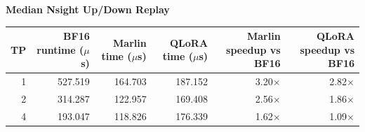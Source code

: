 \documentclass{article}
\begin{document}
\sffamily
\begin{center}
\textbf{Median Nsight Up/Down Replay}

\vspace{0.35em}
\renewcommand{\arraystretch}{1.25}
\begin{tabular}{r r r r r r}
\toprule
TP &
BF16 runtime ($\mu$s) &
Marlin time ($\mu$s) &
QLoRA time ($\mu$s) &
Marlin speedup vs BF16 &
QLoRA speedup vs BF16 \\
\midrule
1 & 527.519 & 164.703 & 187.152 & 3.20$\times$ & 2.82$\times$ \\
2 & 314.287 & 122.957 & 169.408 & 2.56$\times$ & 1.86$\times$ \\
4 & 193.047 & 118.826 & 176.339 & 1.62$\times$ & 1.09$\times$ \\
\bottomrule
\end{tabular}
\end{center}
\end{document}
